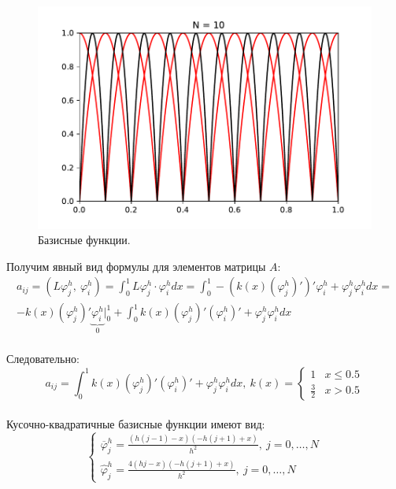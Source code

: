 \documentclass[12pt, a4paper]{article}
\begin{document}
	\begin{figure}[t]
		\includegraphics{basis_function}
		\caption{Базисные функции.}
		\label{ris:basis_function}
	\end{figure}
	Получим явный вид формулы для элементов матрицы $A$:\\
	\begin{multline}
		a_{ij} = \left( L\varphi_j^h,\ \varphi_i^h \right) = 
		\int_{0}^{1} L\varphi_j^h \cdot \varphi_i^h dx =
		\int_{0}^{1} -(k(x)(\varphi_j^h)')'\varphi_i^h + \varphi_j^h\varphi_i^h dx =\\
		-k(x)(\varphi_j^h)'\underbrace{\varphi_i^h}_{\text{0}}\bigg|_0^1+
		\int_{0}^{1} k(x)(\varphi_j^h)'(\varphi_i^h)' + \varphi_j^h\varphi_i^h dx
	\end{multline}\\
	Следовательно:
	\begin{equation}
		a_{ij} = \int_{0}^{1} k(x)(\varphi_j^h)'(\varphi_i^h)' + \varphi_j^h\varphi_i^h dx,\ 
		k(x) = \begin{cases}
				1 & x \leq 0.5\\
				\frac{3}{2} & x > 0.5
			\end{cases}
	\end{equation}\\
	Кусочно-квадратичные базисные функции имеют вид:\\
	\begin{equation}
		\begin{cases}
			\overline{\varphi}_j^h = \frac{(h(j-1)-x)(-h(j+1)+x)}{h^2},\ j = 0,\ldots, N\\
			\widehat{\varphi}_j^h = \frac{4(hj-x)(-h(j+1)+x)}{h^2},\ j = 0,\ldots, N
		\end{cases}
	\end{equation}\\
\end{document}
